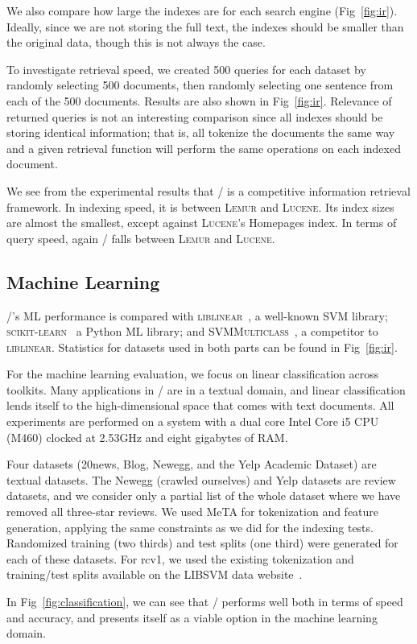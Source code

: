We also compare how large the indexes are for each search engine
(Fig~\ref{fig:ir}). Ideally, since we are not storing the full text, the indexes
should be smaller than the original data, though this is not always the case.

To investigate retrieval speed, we created 500 queries for each dataset by
randomly selecting 500 documents, then randomly selecting one sentence from each
of the 500 documents. Results are also shown in Fig~\ref{fig:ir}. Relevance of
returned queries is not an interesting comparison since all indexes should be
storing identical information; that is, all tokenize the documents the same way
and a given retrieval function will perform the same operations on each indexed
document.

We see from the experimental results that \meta/ is a competitive information
retrieval framework. In indexing speed, it is between \textsc{Lemur} and
\textsc{Lucene}. Its index sizes are almost the smallest, except against
\textsc{Lucene}'s Homepages index. In terms of query speed, again \meta/ falls
between \textsc{Lemur} and \textsc{Lucene}.



\subsection{Machine Learning}

\meta/'s ML performance is compared with \textsc{liblinear}~\cite{liblinear}, a
well-known SVM library; \textsc{scikit-learn}~\cite{scikit} a Python ML library;
and \textsc{SVMMulticlass}~\cite{svmmulticlass}, a competitor to
\textsc{liblinear}. Statistics for datasets used in both parts can be found in
Fig~\ref{fig:ir}.

For the machine learning evaluation, we focus on linear classification across
toolkits. Many applications in \meta/ are in a textual domain, and linear
classification lends itself to the high-dimensional space that comes with text
documents. All experiments are performed on a system with a dual core Intel Core
i5 CPU (M460) clocked at 2.53GHz and eight gigabytes of RAM.

Four datasets (20news, Blog, Newegg, and the Yelp Academic
Dataset\footnotemark[10]) are textual datasets. The Newegg (crawled ourselves)
and Yelp datasets are review datasets, and we consider only a partial list of
the whole dataset where we have removed all three-star reviews. We used MeTA for
tokenization and feature generation, applying the same constraints as we did for
the indexing tests. Randomized training (two thirds) and test splits (one third)
were generated for each of these datasets. For rcv1, we used the existing
tokenization and training/test splits available on the LIBSVM data
website~\footnotemark[11].


In Fig~\ref{fig:classification}, we can see that \meta/ performs well both in
terms of speed and accuracy, and presents itself as a viable option in the
machine learning domain.



